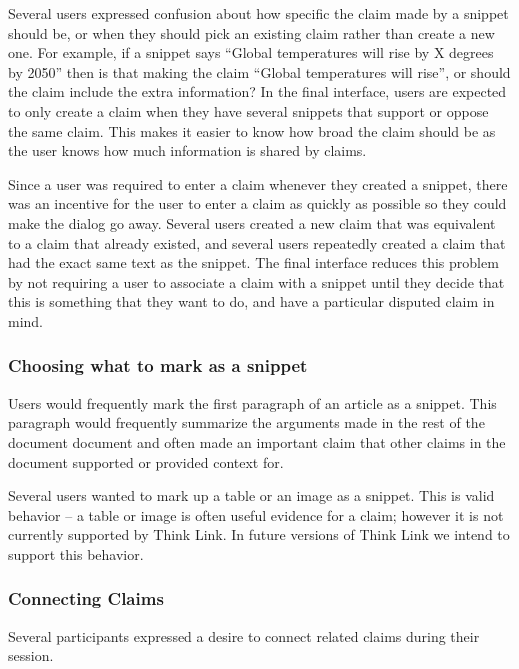 \documentclass{chi2009}
\newcommand{\todo}[1]{}
\begin{document}
Several users expressed confusion about how specific the claim made by a snippet should be, or when they should pick an existing claim rather than create a new one. For example, if a snippet says ``Global temperatures will rise by X degrees by 2050'' then is that making the claim ``Global temperatures will rise'', or should the claim include the extra information? In the final interface, users are expected to only create a claim when they have several snippets that support or oppose the same claim. This makes it easier to know how broad the claim should be as the user knows how much information is shared by claims.

Since a user was required to enter a claim whenever they created a snippet, there was an incentive for the user to enter a claim as quickly as possible so they could make the dialog go away. 
Several users created a new claim that was equivalent to a claim that already existed, and several users repeatedly created a claim that had the exact same text as the snippet. The final interface reduces this problem by not requiring a user to associate a claim with a snippet until they decide that this is something that they want to do, and have a particular disputed claim in mind.

\todo{Need to do some kind of evaluation to show that the new interface solves these problems}


\subsubsection{Choosing what to mark as a snippet}

Users would frequently mark the first paragraph of an article as a snippet. This paragraph would frequently summarize the arguments made in the rest of the document document and often made an important claim that other claims in the document supported or provided context for. 

Several users wanted to mark up a table or an image as a snippet. This is valid behavior -- a table or image is often useful evidence for a claim; however it is not currently supported by Think Link. In future versions of Think Link we intend to support this behavior.


\subsubsection{Connecting Claims}

Several participants expressed a desire to connect related claims during their session. 
\end{document}
